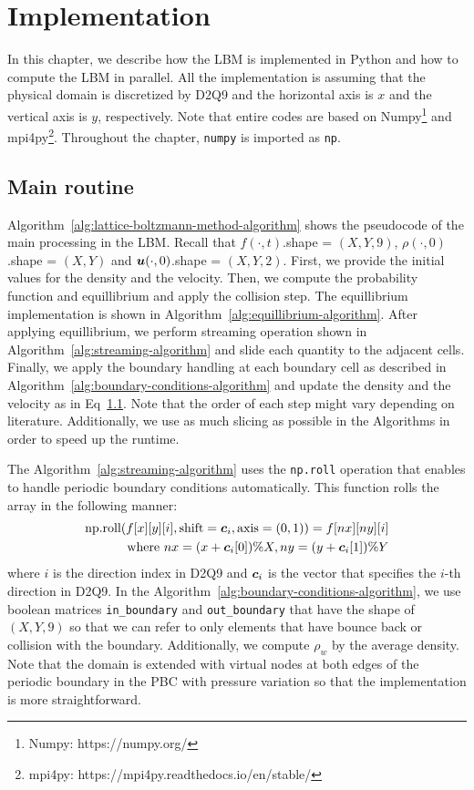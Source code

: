 \chapter{Implementation}
\vspace{-8mm}
In this chapter, we describe how the LBM is implemented in Python
and how to compute the LBM in parallel.
All the implementation is assuming that
the physical domain is discretized by D2Q9
and the horizontal axis is $x$ and 
the vertical axis is $y$, respectively.
Note that entire codes are based on
Numpy\footnote{Numpy: https://numpy.org/}
and mpi4py\footnote{mpi4py: https://mpi4py.readthedocs.io/en/stable/}.
Throughout the chapter, {\tt numpy} is imported as {\tt np}.

\section{Main routine}
Algorithm~\ref{alg:lattice-boltzmann-method-algorithm}
shows the pseudocode of the main processing in the LBM.
Recall that $f(\cdot, t)$.shape = $(X, Y, 9)$,
$\rho(\cdot, 0)$.shape = $(X, Y)$ and $\boldsymbol{u}(\cdot, 0)$.shape = $(X, Y, 2)$.
First, we provide the initial values for the density and the velocity.
Then, we compute the probability function and equillibrium and
apply the collision step.
The equillibrium implementation is shown in Algorithm~\ref{alg:equillibrium-algorithm}.
After applying equillibrium, we perform
streaming operation shown in Algorithm~\ref{alg:streaming-algorithm}
and slide each quantity to the adjacent cells.
Finally, we apply the boundary handling at each boundary cell as 
described in Algorithm~\ref{alg:boundary-conditions-algorithm}
and update the density and the velocity as in Eq~\ref{}.
Note that the order of each step might vary depending on literature\cite{timm2016lattice, succi2018lattice}.
Additionally, we use as much slicing as possible in the Algorithms
in order to speed up the runtime.

The Algorithm~\ref{alg:streaming-algorithm} uses
the {\tt np.roll} operation that enables
to handle periodic boundary conditions automatically.
This function rolls the array in the following manner:
\begin{equation}
\begin{aligned}
  \text{np.roll}(f[x][y][i], \text{shift}=\boldsymbol{c}_i, \text{axis}=(0, 1)) =
  f[nx][ny][i] \\
  \text{where }
  nx = (x + \boldsymbol{c}_i[0]) \% X,
  ny = (y + \boldsymbol{c}_i[1]) \% Y
\end{aligned}
\end{equation}
where $i$ is the direction index in D2Q9 and $\boldsymbol{c}_i$ is the vector
that specifies the $i$-th direction in D2Q9.
In the Algorithm~\ref{alg:boundary-conditions-algorithm},
we use boolean matrices {\tt in\_boundary} and {\tt out\_boundary}
that have the shape of $(X, Y, 9)$ so that 
we can refer to only elements that have bounce back or collision
with the boundary.
Additionally, we compute $\rho_w$ by the average density\cite{khajepor2019study}.
Note that the domain is extended with virtual nodes 
at both edges of the periodic boundary in the PBC with pressure variation
so that the implementation is more straightforward. 



